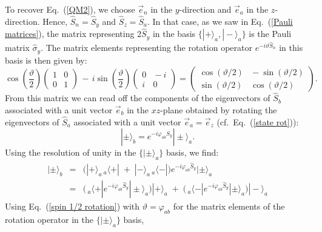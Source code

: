 To recover Eq.\ (\ref{QM2}), we choose $\vec{e}_n$ in the $y$-direction and $\vec{e}_a$ in the $z$-direction. Hence, $\hat{S}_n = \hat{S}_y$ and $\hat{S}_z = \hat{S}_a$. In that case, as we saw in Eq.\ (\ref{Pauli matrices}), the matrix representing $2\hat{S}_y$  in the basis $\big\{| + \rangle_{a}, | - \rangle_{a} \big\}$ is the Pauli matrix $\hat{\sigma}_y$. The matrix elements representing the rotation operator $e^{-i\vartheta \hat{S}_n}$ in this basis is then given by:
\begin{equation}
\cos{\! \left(\frac\vartheta2\right)}  
\begin{pmatrix} 
1  \! & \! 0 \\[.2 cm]
0 \! & \! 1
\end{pmatrix} 
\, - \, i \sin{\! \left(\frac\vartheta2\right)} 
\begin{pmatrix} 
0  \! & \! - i \\[.2 cm]
i \! & \! 0
\end{pmatrix}
= 
\begin{pmatrix} 
\cos{\!(\vartheta/2)} \! & \! - \sin{\!(\vartheta/2)} \\[.2 cm]
\sin{\!(\vartheta/2)} \! & \! \cos{\!(\vartheta/2)}
\end{pmatrix}.
\label{spin 1/2 rotation}
\end{equation}
From this matrix we can read off the components of the eigenvectors of $\hat{S}_b$ associated with a unit vector $\vec{e}_b$ in the $xz$-plane obtained by rotating the eigenvectors of $\hat{S}_a$ associated with a unit vector $\vec{e}_a = \vec{e}_z$ (cf.\ Eq.\ (\ref{state rot})):
\begin{equation}
| \pm \rangle_b = e^{-i \varphi_{ab} \hat{S}_y} | \pm \rangle_a.
\end{equation}
Using the resolution of unity in the $\{| \pm \rangle_a \}$ basis, we find:
\begin{eqnarray}
| \pm \rangle_b & \!\!\! =  \!\!\! & \Big( |+\rangle_{\!a} \, _{a\!}\langle +| \; + \; |-\rangle_{\!a} \, _{a\!}\langle -| \Big) e^{-i \varphi_{ab} \hat{S}_y} | \pm \rangle_a
\nonumber \\
 & \!\!\! =  \!\!\! & \Big(\!\,  _{a\!}\langle +| e^{-i \varphi_{ab} \hat{S}_y} | \pm \rangle_a \! \Big) |+\rangle_a 
 \; + \; \Big(\!\,  _{a\!}\langle -| e^{-i \varphi_{ab} \hat{S}_y} | \pm \rangle_a \! \Big) |-\rangle_a 
\label{b +/- trans law}
\end{eqnarray}
Using Eq.\ (\ref{spin 1/2 rotation}) with $\vartheta = \varphi_{ab}$ for the matrix elements of the rotation operator in the $\{ | \pm \rangle_a \}$ basis,
